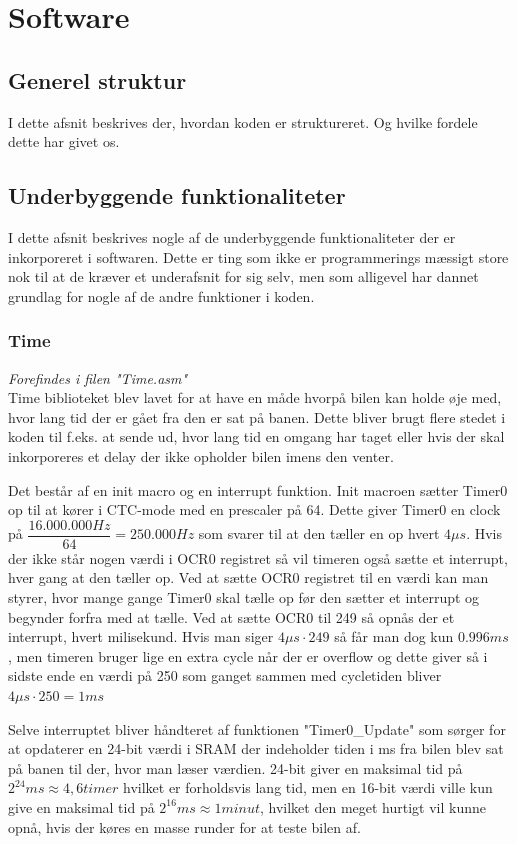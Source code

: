 \section{Software}

\subsection{Generel struktur}
I dette afsnit beskrives der, hvordan koden er struktureret. Og hvilke fordele dette har givet os.

\subsection{Underbyggende funktionaliteter}
I dette afsnit beskrives nogle af de underbyggende funktionaliteter der er inkorporeret i softwaren. Dette er ting som ikke er programmerings mæssigt store nok til at de kræver et underafsnit for sig selv, men som alligevel har dannet grundlag for nogle af de andre funktioner i koden.

\subsubsection{Time}
\textit{Forefindes i filen "Time.asm"}\\
Time biblioteket blev lavet for at have en måde hvorpå bilen kan holde øje med, hvor lang tid der er gået fra den er sat på banen. Dette bliver brugt flere stedet i koden til f.eks. at sende ud, hvor lang tid en omgang har taget eller hvis der skal inkorporeres et delay der ikke opholder bilen imens den venter. 

Det består af en init macro og en interrupt funktion. Init macroen sætter Timer0 op til at kører i CTC-mode med en prescaler på 64. Dette giver Timer0 en clock på $\dfrac{16.000.000Hz}{64} = 250.000Hz$ som svarer til at den tæller en op hvert $4\mu s$. Hvis der ikke står nogen værdi i OCR0 registret så vil timeren også sætte et interrupt, hver gang at den tæller op. Ved at sætte OCR0 registret til en værdi kan man styrer, hvor mange gange Timer0 skal tælle op før den sætter et interrupt og begynder forfra med at tælle. Ved at sætte OCR0 til 249 så opnås der et interrupt, hvert milisekund. Hvis man siger $4\mu s  \cdot 249$ så får man dog kun $0.996 ms$, men timeren bruger lige en extra cycle når der er overflow og dette giver så i sidste ende en værdi på 250 som ganget sammen med cycletiden bliver $4\mu s  \cdot 250 = 1ms$ \par
Selve interruptet bliver håndteret af funktionen "Timer0\_Update" som sørger for at opdaterer en 24-bit værdi i SRAM der indeholder tiden i ms fra bilen blev sat på banen til der, hvor man læser værdien. 24-bit giver en maksimal tid på $2^{24} ms \approx 4,6 timer$ hvilket er forholdsvis lang tid, men en 16-bit værdi ville kun give en maksimal tid på $2^{16}ms \approx 1 minut$, hvilket den meget hurtigt vil kunne opnå, hvis der køres en masse runder for at teste bilen af.

